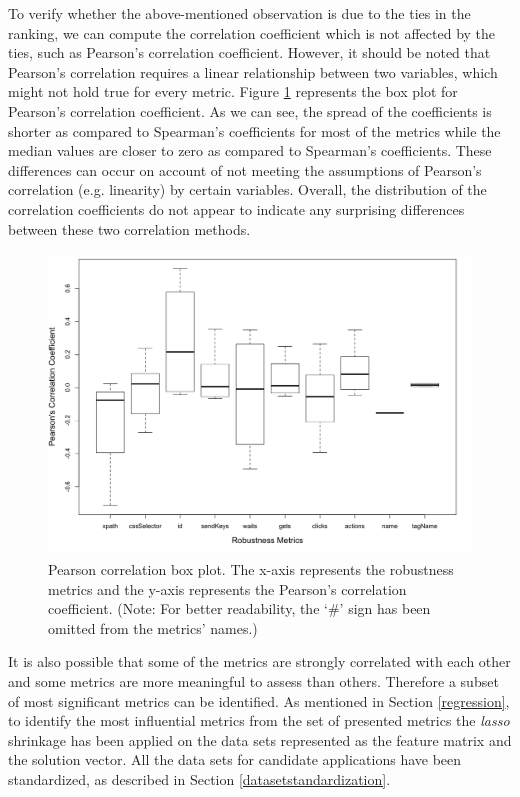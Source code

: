 To verify whether the above-mentioned observation is due to the ties in the ranking, we can compute the correlation coefficient which is not affected by the ties, such as Pearson's correlation coefficient. However, it should be noted that Pearson's correlation requires a linear relationship between two variables, which might not hold true for every metric. Figure \ref{fig:pearson} represents the box plot for Pearson's correlation coefficient. As we can see, the spread of the coefficients is shorter as compared to Spearman's coefficients for most of the metrics while the median values are closer to zero as compared to Spearman's coefficients. These differences can occur on account of not meeting the assumptions of Pearson's correlation (e.g. linearity) by certain variables. Overall, the distribution of the correlation coefficients do not appear to indicate any surprising differences between these two correlation methods.

\begin{figure}[ht!] 
\centering     %
\includegraphics[width=12cm,height=8cm]{./Figures/pearson-rq2}
 \captionsetup{justification=justified,
singlelinecheck=false}
\caption{Pearson correlation box plot. The x-axis represents the robustness metrics and the y-axis represents the Pearson's correlation coefficient. (Note: For better readability, the `\#' sign has been omitted from the metrics' names.)}
\label{fig:pearson}
\end{figure}

It is also possible that some of the metrics are  strongly correlated with each other and some metrics are more meaningful to assess than others. Therefore a subset of most significant metrics can be identified. As mentioned in Section \ref{regression}, to identify the most influential metrics from the set of presented metrics the \textit{lasso} shrinkage has been applied on the data sets represented as the feature matrix and the solution vector. All the data sets for candidate applications have been standardized, as described in Section \ref{datasetstandardization}. 


